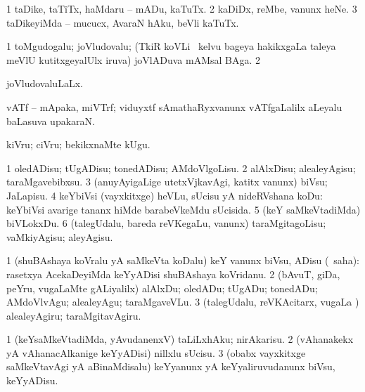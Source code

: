 {\bentry
{} 
\gl{\sakirx}
\expl{}
\bmng
\bnum
\num{1} taDike, taTiTx, haMdaru -- mADu, kaTuTx. 
\num{2} kaDiDx, reMbe, \mo vanunx heNe. 
\num{3} taDikeyiMda -- mucucx, AvaraN hAku, beVli kaTuTx. 
\enum
\emng
\eentry

\bentry
{} 
\gl{\nA}
\expl{}
\bmng
\bnum
\num{1} toMgudogalu; joVludovalu; (TkiR koVLi \mo\ kelvu bageya hakikxgaLa taleya meVlU kutitxgeyalUlx iruva) joVlADuva mAMsal BAga. 
\num{2}  
\enum
\emng
\eentry

\bentry
{} 
\gl{\gu}
\expl{}
\bmng
joVludovaluLaLx. 
\emng
\eentry

\bentry
{} 
\gl{\nA}
\expl{}
\bmng
vATf -- mApaka, miVTrf; viduyxtf sAmathaRyxvanunx vATfgaLalilx aLeyalu baLasuva upakaraN. 
\emng
\eentry

\bentry
{} 
\gl{\akirx}
\expl{}
\bmng
kiVru; ciVru; bekikxnaMte kUgu. 
\emng
\eentry

\bentry
{} 
\gl{\sakirx}
\expl{}
\bmng
\bnum
\num{1} oledADisu; tUgADisu; tonedADisu; AMdoVlgoLisu. 
\num{2} alAlxDisu; alealeyAgisu; taraMgavebibxsu. 
\num{3} (anuyAyigaLige utetxVjkavAgi, katitx \mo vanunx) biVsu; JaLapisu. 
\num{4} keYbiVsi (vayxkitxge) heVLu, sUcisu yA nideRVshana koDu:  keYbiVsi avarige tananx hiMde barabeVkeMdu sUcisida. 
\num{5} (keY saMkeVtadiMda) biVLokxDu. 
\num{6} (talegUdalu, bareda reVKegaLu, \mo vanunx) taraMgitagoLisu; vaMkiyAgisu; aleyAgisu. 
\enum
\emng

\noindent
\gl{\akirx}
\expl{}
\bmng
\bnum
\num{1} (shuBAshaya koVralu yA saMkeVta koDalu) keY \mo vanunx biVsu, ADisu (\sakirx\ saha):  rasetxya AcekaDeyiMda keYyADisi shuBAshaya koVridanu. 
\num{2} (bAvuT, giDa, peYru, \mo vugaLaMte gALiyalilx) alAlxDu; oledADu; tUgADu; tonedADu; AMdoVlvAgu; alealeyAgu; taraMgaveVLu. 
\num{3} (talegUdalu, reVKAcitarx, \mo vugaLa \vi) alealeyAgiru; taraMgitavAgiru. 
\enum
\emng

\noindent 
\gl{\pagu}
\expl{}
\bmng
\bnum
\num{1}  (keYsaMkeVtadiMda, yAvudanenxV) taLiLxhAku; nirAkarisu. 
\num{2}  (vAhanakekx yA vAhanacAlkanige keYyADisi) nillxlu sUcisu. 
\num{3}  (obabx vayxkitxge saMkeVtavAgi yA aBinaMdisalu) keYyanunx yA keYyaliruvudanunx biVsu, keYyADisu. 
\enum
\emng
\eentry

}
